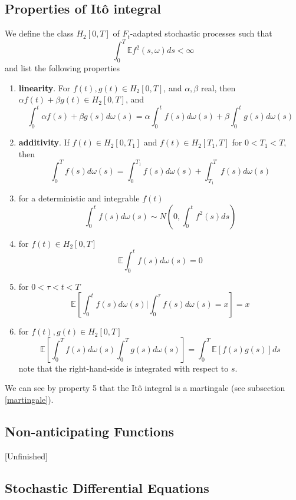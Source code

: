 \documentclass[12pt]{paper}
\begin{document}
\subsection{Properties of It\^{o} integral}

We define the class $H_2[0,T]$ of $F_t$-adapted stochastic processes such that 
\begin{equation*}
\int_0^T \mathbb{E}f^2(s,\omega)ds <\infty
\end{equation*}
and list the following properties
\begin{enumerate}
\item \textbf{linearity}. For $f(t),g(t)\in H_2[0,T]$, and $\alpha,\beta$ real, then $\alpha f(t)+\beta g(t) \in H_2[0,T]$, and 
\begin{equation*}
\int_0^t \alpha f(s)+\beta g(s) d\omega(s) = \alpha \int_0^t f(s)d\omega(s) +\beta \int_0^t g(s)d\omega(s)
\end{equation*}
\item \textbf{additivity}. If $f(t)\in H_2[0,T_1]$ and $f(t)\in H_2[T_1,T]$ for $0<T_1<T$, then 
\begin{equation*}
\int_0^Tf(s)d\omega(s) = \int_0^{T_1}f(s)d\omega(s) +\int_{T_1}^T f(s)d\omega(s)
\end{equation*}
\item for a deterministic and integrable $f(t)$
\begin{equation*}
\int_0^t f(s)d\omega(s) \sim N\left(0,\int_0^t f^2(s)ds\right)
\end{equation*}
\item for $f(t)\in H_2[0,T]$
\begin{equation*}
\mathbb{E}\int_0^t f(s)d\omega(s) = 0
\end{equation*}
\item for $0<\tau<t<T$  
\begin{equation*}
\mathbb{E}\left[\int_0^t f(s)d\omega(s)  | \int_0^\tau f(s)d\omega(s)=x \right] =x 
\end{equation*}
\item for $f(t),g(t)\in H_2[0,T]$
\begin{equation*}
\mathbb{E}\left[\int_0^Tf(s)d\omega(s)\int_0^T g(s)d\omega(s)\right]=\int_0^T\mathbb{E}[f(s)g(s)]ds
\end{equation*}
note that the right-hand-side is integrated with respect to $s$.
\end{enumerate}
We can see by property 5 that the It\^{o} integral is a martingale (see subsection \ref{martingale}).
\subsection{Non-anticipating Functions}{[Unfinished]}
\subsection{Stochastic Differential Equations}
\end{document}
